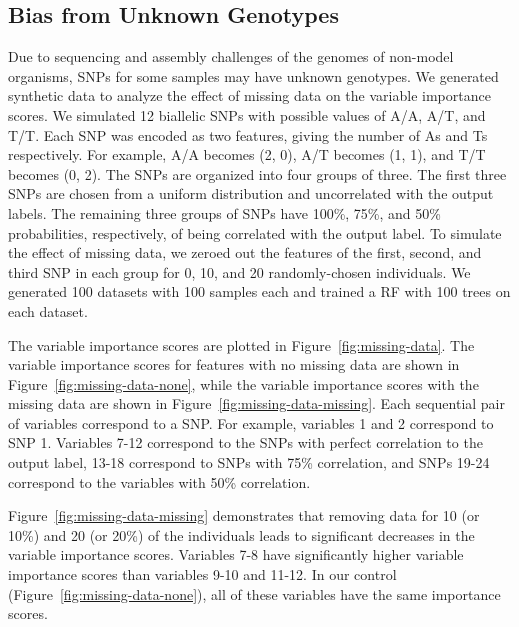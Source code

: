 
\subsection{Bias from Unknown Genotypes}
Due to sequencing and assembly challenges of the genomes of non-model organisms, SNPs for some samples may have unknown genotypes.  We generated synthetic data to analyze the effect of missing data on the variable importance scores.  We simulated 12 biallelic SNPs with possible values of A/A, A/T, and T/T.  Each SNP was encoded as two features, giving the number of As and Ts respectively.  For example, A/A becomes (2, 0), A/T becomes (1, 1), and T/T becomes (0, 2).  The SNPs are organized into four groups of three.  The first three SNPs are chosen from a uniform distribution and uncorrelated with the output labels.  The remaining three groups of SNPs have 100\%, 75\%, and 50\% probabilities, respectively, of being correlated with the output label. To simulate the effect of missing data, we zeroed out the features of the first, second, and third SNP in each group for 0, 10, and 20 randomly-chosen individuals.  We generated 100 datasets with 100 samples each and trained a RF with 100 trees on each dataset.  

The variable importance scores are plotted in Figure~\ref{fig:missing-data}.  The variable importance scores for features with no missing data are shown in Figure~\ref{fig:missing-data-none}, while the variable importance scores with the missing data are shown in Figure~\ref{fig:missing-data-missing}.  Each sequential pair of variables correspond to a SNP.  For example, variables 1 and 2 correspond to SNP 1. Variables 7-12 correspond to the SNPs with perfect correlation to the output label, 13-18 correspond to SNPs with 75\% correlation, and SNPs 19-24 correspond to the variables with 50\% correlation.

Figure~\ref{fig:missing-data-missing} demonstrates that removing data for 10 (or 10\%) and 20 (or 20\%) of the individuals leads to significant decreases in the variable importance scores.  Variables 7-8 have significantly higher variable importance scores than variables 9-10 and 11-12. In our control (Figure~\ref{fig:missing-data-none}), all of these variables have the same importance scores.

